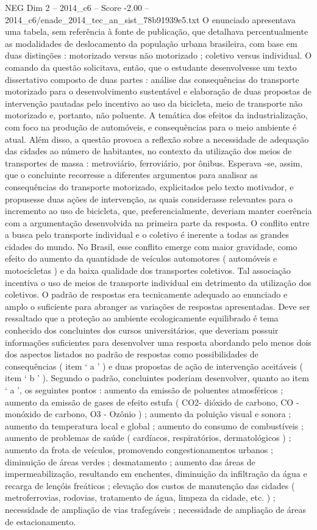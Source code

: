 \begin{textsample}{NEG Dim 2 – 2014\_c6 – Score -2.00 – 2014\_c6/enade\_2014\_tec\_an\_sist\_78b91939e5.txt}
O enunciado apresentava uma tabela, sem referência à fonte de publicação, que detalhava percentualmente as modalidades de deslocamento da população urbana brasileira, com base em duas distinções : motorizado versus não motorizado ; coletivo versus individual.
O comando da questão solicitava, então, que o estudante desenvolvesse um texto dissertativo composto de duas partes : análise das consequências do transporte motorizado para o desenvolvimento sustentável e elaboração de duas propostas de intervenção pautadas pelo incentivo ao uso da bicicleta, meio de transporte não motorizado e, portanto, não poluente.
A temática dos efeitos da industrialização, com foco na produção de automóveis, e consequências para o meio ambiente é atual.
Além disso, a questão provoca a reflexão sobre a necessidade de adequação das cidades ao número de habitantes, no contexto da utilização dos meios de transportes de massa : metroviário, ferroviário, por ônibus.
Esperava -se, assim, que o concluinte recorresse a diferentes argumentos para analisar as consequências do transporte motorizado, explicitados pelo texto motivador, e propusesse duas ações de intervenção, as quais considerasse relevantes para o incremento ao uso de bicicleta, que, preferencialmente, deveriam manter coerência com a argumentação desenvolvida na primeira parte da resposta.
O conflito entre a busca pelo transporte individual e o coletivo é inerente a todas as grandes cidades do mundo.
No Brasil, esse conflito emerge com maior gravidade, como efeito do aumento da quantidade de veículos automotores ( automóveis e motocicletas ) e da baixa qualidade dos transportes coletivos.
Tal associação incentiva o uso de meios de transporte individual em detrimento da utilização dos coletivos.
O padrão de respostas era tecnicamente adequado ao enunciado e amplo o suficiente para abranger as variações de respostas apresentadas.
Deve ser ressaltado que a proteção ao ambiente ecologicamente equilibrado é tema conhecido dos concluintes dos cursos universitários, que deveriam possuir informações suficientes para desenvolver uma resposta abordando pelo menos dois dos aspectos listados no padrão de respostas como possibilidades de consequências ( item ‘ a ’ ) e duas propostas de ação de intervenção aceitáveis ( item ‘ b ’ ).
Segundo o padrão, concluintes poderiam desenvolver, quanto ao item ‘ a ’, os seguintes pontos : aumento da emissão de poluentes atmosféricos ; aumento da emissão de gases de efeito estufa ( CO2- dióxido de carbono, CO - monóxido de carbono, O3 - Ozônio ) ; aumento da poluição visual e sonora ; aumento da temperatura local e global ; aumento do consumo de combustíveis ; aumento de problemas de saúde ( cardíacos, respiratórios, dermatológicos ) ; aumento da frota de veículos, promovendo congestionamentos urbanos ; diminuição de áreas verdes ; desmatamento ; aumento das áreas de impermeabilização, resultando em enchentes, diminuição da infiltração da água e recarga de lençóis freáticos ; elevação dos custos de manutenção das cidades ( metroferrovias, rodovias, tratamento de água, limpeza da cidade, etc. ) ; necessidade de ampliação de vias trafegáveis ; necessidade de ampliação de áreas de estacionamento.

\end{textsample}
